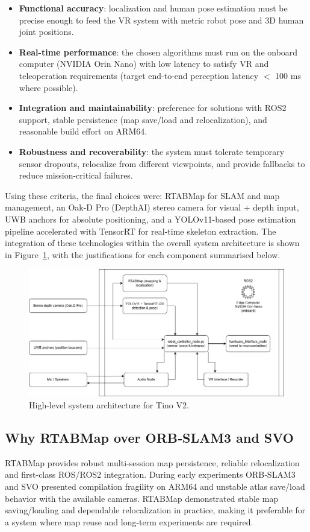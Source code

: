 \begin{itemize}
	\item \textbf{Functional accuracy}: localization and human pose estimation must be precise enough to feed the VR system with metric robot pose and 3D human joint positions.
	\item \textbf{Real-time performance}: the chosen algorithms must run on the onboard computer (NVIDIA Orin Nano) with low latency to satisfy VR and teleoperation requirements (target end-to-end perception latency $<$ 100 ms where possible).
	\item \textbf{Integration and maintainability}: preference for solutions with ROS2 support, stable persistence (map save/load and relocalization), and reasonable build effort on ARM64.
	\item \textbf{Robustness and recoverability}: the system must tolerate temporary sensor dropouts, relocalize from different viewpoints, and provide fallbacks to reduce mission-critical failures.
\end{itemize}

Using these criteria, the final choices were: RTABMap for SLAM and map management, an Oak-D Pro (DepthAI) stereo camera for visual + depth input, UWB anchors for absolute positioning, and a YOLOv11-based pose estimation pipeline accelerated with TensorRT for real-time skeleton extraction. The integration of these technologies within the overall system architecture is shown in Figure~\ref{fig-system-architecture}, with the justifications for each component summarised below.

\begin{figure}[H]
	\centering
	\includegraphics[width=0.85\linewidth]{Images/system_architecture.png}
	\caption{High-level system architecture for Tino V2.}\label{fig-system-architecture}
\end{figure}

\subsection*{Why RTABMap over ORB‑SLAM3 and SVO}
RTABMap provides robust multi-session map persistence, reliable relocalization and first-class ROS/ROS2 integration. During early experiments ORB‑SLAM3 and SVO presented compilation fragility on ARM64 and unstable atlas save/load behavior with the available cameras. RTABMap demonstrated stable map saving/loading and dependable relocalization in practice, making it preferable for a system where map reuse and long-term experiments are required.


